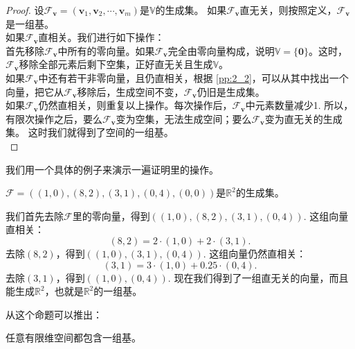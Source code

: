 \documentclass[12pt,UTF8,fontset=none]{ctexbook}
\begin{document}
\begin{proof} %
    设$\mathcal{F}_{\mathbf{v}} = (\mathbf{v}_1, \mathbf{v}_2, \cdots , \mathbf{v}_m )$是$\mathbb{V}$的生成集。
    如果$\mathcal{F}_{\mathbf{v}}$直无关，则按照定义，$\mathcal{F}_{\mathbf{v}}$是一组基。\\
    如果$\mathcal{F}_{\mathbf{v}}$直相关。我们进行如下操作：\\
    首先移除$\mathcal{F}_{\mathbf{v}}$中所有的零向量。如果$\mathcal{F}_{\mathbf{v}}$完全由零向量构成，说明$\mathbb{V} = \{\mathbf{0}\}$。这时，$\mathcal{F}_{\mathbf{v}}$移除全部元素后剩下空集，正好直无关且生成$\mathbb{V}$。\\
    如果$\mathcal{F}_{\mathbf{v}}$中还有若干非零向量，且仍直相关，根据 \ref{pp:2_2}，可以从其中找出一个向量，把它从$\mathcal{F}_{\mathbf{v}}$移除后，生成空间不变，$\mathcal{F}_{\mathbf{v}}$仍旧是生成集。\\
    如果$\mathcal{F}_{\mathbf{v}}$仍然直相关，则重复以上操作。每次操作后，$\mathcal{F}_{\mathbf{v}}$中元素数量减少1. 所以，有限次操作之后，要么$\mathcal{F}_{\mathbf{v}}$变为空集，无法生成空间；要么$\mathcal{F}_{\mathbf{v}}$变为直无关的生成集。
    这时我们就得到了空间的一组基。\\
\end{proof}


我们用一个具体的例子来演示一遍证明里的操作。

$\mathcal{F} = \left((1,0),(8,2),(3,1),(0,4),(0,0)\right)$是$\mathbb{R}^2$的生成集。

我们首先去除$\mathcal{F}$里的零向量，得到$\left((1,0),(8,2),(3,1),(0,4)\right).$ 这组向量直相关：
$$ (8,2) = 2\cdot(1,0) + 2\cdot(3,1).$$
去除$(8,2)$，得到$\left((1,0),(3,1),(0,4)\right).$ 这组向量仍然直相关：
$$ (3,1) = 3\cdot(1,0) + 0.25\cdot(0,4).$$
去除$(3,1)$，得到$\left((1,0),(0,4)\right).$ 现在我们得到了一组直无关的向量，而且能生成$\mathbb{R}^2$，也就是$\mathbb{R}^2$的一组基。

从这个命题可以推出：
\begin{cor}\label{cor:2_1}
    任意有限维空间都包含一组基。
\end{cor}
\end{document}
